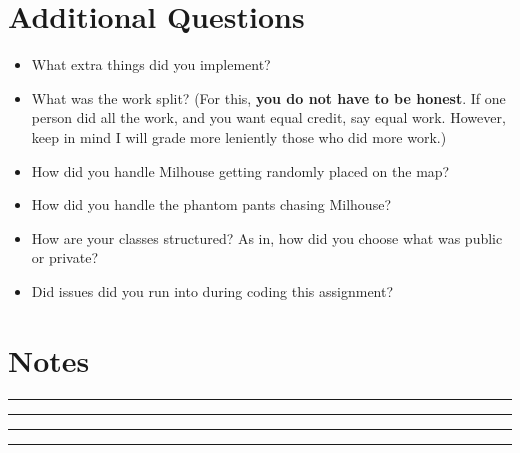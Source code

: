 \documentclass[12pt]{scrartcl}
\begin{document}
\section{Additional Questions}
\begin{itemize}
    \item What extra things did you implement?
    \item What was the work split? (For this, \textbf{you do not have to be honest}. If one person did all the work, and you want equal credit, say equal work. However, keep in mind I will grade more leniently those who did more work.)
    \item How did you handle Milhouse getting randomly placed on the map?
    \item How did you handle the phantom pants chasing Milhouse?
    \item How are your classes structured? As in, how did you choose what was public or private?
    \item Did issues did you run into during coding this assignment?
\end{itemize}

\section{Notes}
\rule{\textwidth}{.5pt}
\rule{\textwidth}{.5pt}
\rule{\textwidth}{.5pt}
\rule{\textwidth}{.5pt}
\end{document}
